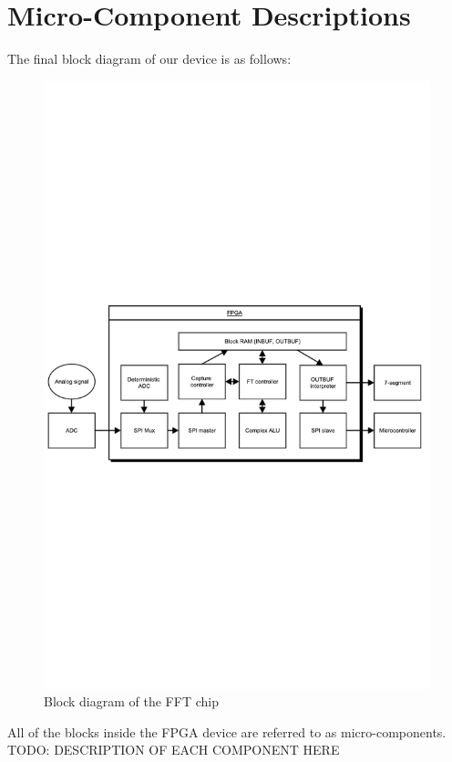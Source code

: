 \documentclass[12pt]{article}
\begin{document}
  \section*{Micro-Component Descriptions}
    The final block diagram of our device is as follows:
    \begin{figure}[H]
      \centering
      \includegraphics[trim=0 400 0 400,clip,width=140mm]{vhdl_fft.pdf}
      \caption{Block diagram of the FFT chip}
      \label{overflow}
    \end{figure}
    All of the blocks inside the FPGA device are referred to as micro-components. \\

    TODO: DESCRIPTION OF EACH COMPONENT HERE
\end{document}

